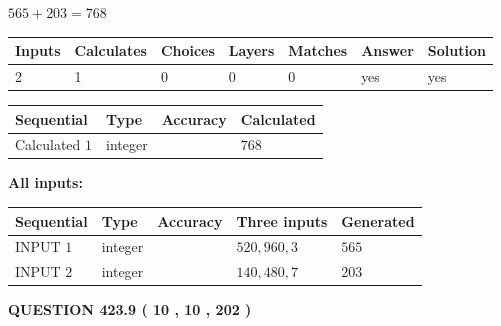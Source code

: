\documentclass{ctexart}
\begin{document}
 

$ %
565 +  %
203=   %
768$
 
 
\noindent{}
 
 

 
   
   
   
   
\noindent\begin{tabular}{|l|l|l|l|l|l|l|}
 \hline
Inputs & Calculates & Choices & Layers & Matches & Answer & Solution \\ \hline
 2  & 
 1  & 
 0
  & 
 0  & 
 0  & 
  yes & 
  yes 
  \\ \hline
 \end{tabular}
   
   
   
   
\noindent{}
   
   
  
  
\noindent\begin{tabular}{|l|l|l|l|}
\hline
 Sequential & Type & Accuracy & Calculated \\ 
\hline
 
 
  Calculated $  1 $ & integer &  & 
  $ 768 $ 
 \\  \hline  
 \end{tabular}
   
   
   
   
\noindent\vspace{0.1in}\hspace{-0.08in} {\textbf{\Large{All inputs: }}}
   
   
  
  
\noindent\begin{tabular}{|l|l|l|l|l|}
\hline
 Sequential & Type & Accuracy & Three inputs & Generated \\ 
\hline
 
 
  INPUT $  1 $ & integer &  & $
 520
 , 
 960
 , 
 3
 $ & $ 565 $ 
 \\  \hline  
 
 
  INPUT $  2 $ & integer &  & $
 140
 , 
 480
 , 
 7
 $ & $ 203 $ 
 \\  \hline  
 \end{tabular}
   
   
  
\vspace{0.2in}
  
{\textbf{\Large{QUESTION
423.9 
 ( 10 , 10 , 202 )
}}}
  
\end{document}
